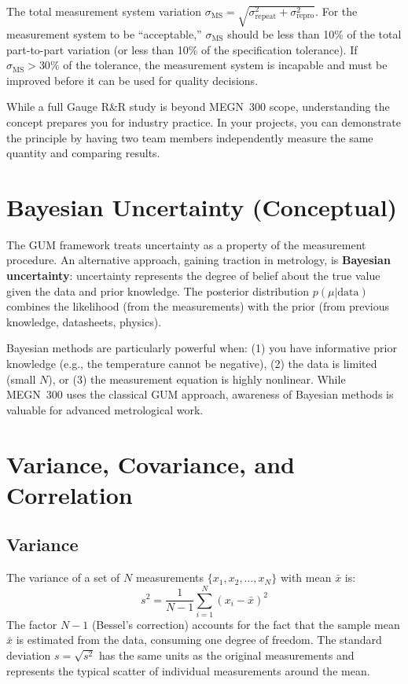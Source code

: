 \documentclass[11pt,letterpaper,twoside,openany]{book}
\begin{document}
The total measurement system variation $\sigma_{\text{MS}} = \sqrt{\sigma_{\text{repeat}}^2 + \sigma_{\text{repro}}^2}$. For the measurement system to be ``acceptable,'' $\sigma_{\text{MS}}$ should be less than 10\% of the total part-to-part variation (or less than 10\% of the specification tolerance). If $\sigma_{\text{MS}} > 30\%$ of the tolerance, the measurement system is incapable and must be improved before it can be used for quality decisions.

While a full Gauge R\&R study is beyond MEGN~300 scope, understanding the concept prepares you for industry practice. In your projects, you can demonstrate the principle by having two team members independently measure the same quantity and comparing results.

\section{Bayesian Uncertainty (Conceptual)}
The GUM framework treats uncertainty as a property of the measurement procedure. An alternative approach, gaining traction in metrology, is \textbf{Bayesian uncertainty}: uncertainty represents the degree of belief about the true value given the data and prior knowledge. The posterior distribution $p(\mu | \text{data})$ combines the likelihood (from the measurements) with the prior (from previous knowledge, datasheets, physics).

Bayesian methods are particularly powerful when: (1) you have informative prior knowledge (e.g., the temperature cannot be negative), (2) the data is limited (small $N$), or (3) the measurement equation is highly nonlinear. While MEGN~300 uses the classical GUM approach, awareness of Bayesian methods is valuable for advanced metrological work.
\section{Variance, Covariance, and Correlation}
\subsection{Variance}
The variance of a set of $N$ measurements $\{x_1, x_2, \ldots, x_N\}$ with mean $\bar{x}$ is:
\begin{equation}
s^2 = \frac{1}{N-1}\sum_{i=1}^{N}(x_i - \bar{x})^2
\end{equation}
The factor $N-1$ (Bessel's correction) accounts for the fact that the sample mean $\bar{x}$ is estimated from the data, consuming one degree of freedom. The standard deviation $s = \sqrt{s^2}$ has the same units as the original measurements and represents the typical scatter of individual measurements around the mean.
\end{document}
